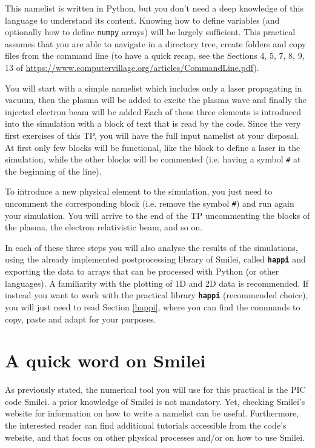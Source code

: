\documentclass{article}
\newcommand{\smilei}{{\sc Smilei}\xspace}
\newcommand{\commandline}[1]{\texttt{\textbf{#1}}}
\begin{document}
This namelist is written in Python, but you don't need a deep knowledge of this language to understand its content. Knowing how to define variables (and optionally how to define \texttt{numpy} arrays) will be largely sufficient. This practical assumes that you are able to navigate in a directory tree, create folders and copy files from the command line (to have a quick recap, see the Sections 4, 5, 7, 8, 9, 13 of \url{https://www.computervillage.org/articles/CommandLine.pdf}). 

You will start with a simple namelist which includes only a laser propagating in vacuum, then the plasma will be added to excite the plasma wave and finally the injected electron beam will be added Each of these three elements is introduced into the simulation with a block of text that is read by the code. Since the very first exercises of this TP, you will have the full input namelist at your disposal. At first only few blocks will be functional, like the block to define a laser in the simulation, while the other blocks will be commented (i.e. having a symbol \texttt{\#} at the beginning of the line).

To introduce a new physical element to the simulation, you just need to uncomment the corresponding block (i.e. remove the symbol \texttt{\#}) and run  again your simulation. You will arrive to the end of the TP uncommenting the blocks of the plasma, the electron relativistic beam, and so on.

In each of these three steps you will also analyse the results of the simulations, using the already implemented postprocessing library of \smilei, called \commandline{happi} and exporting the data to arrays that can be processed with Python (or other languages).  A familiarity with the plotting of 1D and 2D data is recommended. If instead you want to work with the practical library \commandline{happi} (recommended choice), you will just need to read Section \ref{happi}, where you can find the commands to copy, paste and adapt  for your purposes.

\newpage

\section*{A quick word on \smilei} %

As previously stated, the numerical tool you will use for this practical is the PIC code \smilei. a prior knowledge of \smilei is not mandatory.
Yet, checking \smilei's website for information on how to write a namelist can be useful. 
Furthermore, the interested reader can find additional tutorials accessible from the code's website, and that focus on other physical processes and/or on how to use \smilei.
\end{document}
